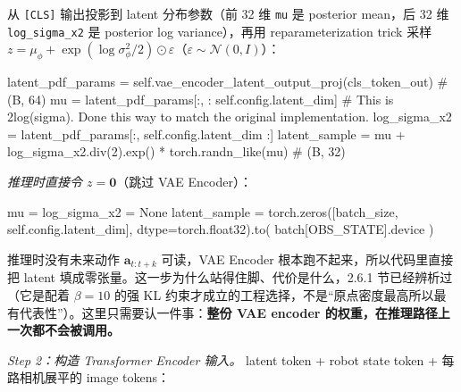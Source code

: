 \documentclass[
  chinese,
]{ctexart}
\newenvironment{Shaded}{\begin{snugshade}}{\end{snugshade}}
\newcommand{\CommentTok}[1]{\textcolor[rgb]{0.37,0.37,0.37}{#1}}
\newcommand{\DecValTok}[1]{\textcolor[rgb]{0.68,0.00,0.00}{#1}}
\newcommand{\NormalTok}[1]{\textcolor[rgb]{0.00,0.23,0.31}{#1}}
\newcommand{\OperatorTok}[1]{\textcolor[rgb]{0.37,0.37,0.37}{#1}}
\newcommand{\VariableTok}[1]{\textcolor[rgb]{0.07,0.07,0.07}{#1}}
\begin{document}
从 \texttt{{[}CLS{]}} 输出投影到 latent 分布参数（前 32 维 \texttt{mu}
是 posterior mean，后 32 维 \texttt{log\_sigma\_x2} 是 posterior log
variance），再用 reparameterization trick 采样
\(z = \mu_\phi + \exp(\log\sigma^2_\phi / 2) \odot \varepsilon\)（\(\varepsilon \sim \mathcal{N}(0, I)\)）：

\begin{Shaded}
\begin{Highlighting}[]
\NormalTok{latent\_pdf\_params }\OperatorTok{=} \VariableTok{self}\NormalTok{.vae\_encoder\_latent\_output\_proj(cls\_token\_out)          }\CommentTok{\# (B, 64)}
\NormalTok{mu }\OperatorTok{=}\NormalTok{ latent\_pdf\_params[:, : }\VariableTok{self}\NormalTok{.config.latent\_dim]}
\CommentTok{\# This is 2log(sigma). Done this way to match the original implementation.}
\NormalTok{log\_sigma\_x2 }\OperatorTok{=}\NormalTok{ latent\_pdf\_params[:, }\VariableTok{self}\NormalTok{.config.latent\_dim :]}
\NormalTok{latent\_sample }\OperatorTok{=}\NormalTok{ mu }\OperatorTok{+}\NormalTok{ log\_sigma\_x2.div(}\DecValTok{2}\NormalTok{).exp() }\OperatorTok{*}\NormalTok{ torch.randn\_like(mu)           }\CommentTok{\# (B, 32)}
\end{Highlighting}
\end{Shaded}

\emph{推理时直接令 \(z = \mathbf{0}\)}（跳过 VAE Encoder）：

\begin{Shaded}
\begin{Highlighting}[]
\NormalTok{mu }\OperatorTok{=}\NormalTok{ log\_sigma\_x2 }\OperatorTok{=} \VariableTok{None}
\NormalTok{latent\_sample }\OperatorTok{=}\NormalTok{ torch.zeros([batch\_size, }\VariableTok{self}\NormalTok{.config.latent\_dim], dtype}\OperatorTok{=}\NormalTok{torch.float32).to(}
\NormalTok{    batch[OBS\_STATE].device}
\NormalTok{)}
\end{Highlighting}
\end{Shaded}

推理时没有未来动作 \(\mathbf{a}_{t:t+k}\) 可读，VAE Encoder
根本跑不起来，所以代码里直接把 latent
填成零张量。这一步为什么站得住脚、代价是什么，2.6.1
节已经辨析过（它是配着 \(\beta = 10\) 的强 KL
约束才成立的工程选择，不是``原点密度最高所以最有代表性''）。这里只需要认一件事：\textbf{整份
VAE encoder 的权重，在推理路径上一次都不会被调用。}

\emph{Step 2：构造 Transformer Encoder 输入。} latent token + robot
state token + 每路相机展平的 image tokens：
\end{document}

